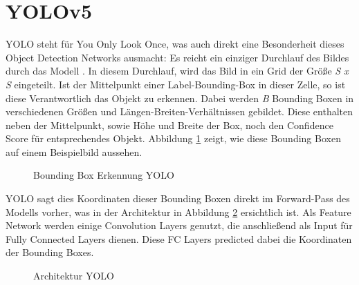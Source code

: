 \section{YOLOv5}
YOLO steht für You Only Look Once, was auch direkt eine Besonderheit dieses Object Detection Networks ausmacht: Es reicht ein einziger Durchlauf des Bildes durch das Modell \cite{yolo1}.
In diesem Durchlauf, wird das Bild in ein Grid der Größe \textit{S x S} eingeteilt. 
Ist der Mittelpunkt einer Label-Bounding-Box in dieser Zelle, so ist diese Verantwortlich das Objekt zu erkennen.
Dabei werden \textit{B} Bounding Boxen in verschiedenen Größen und Längen-Breiten-Verhältnissen gebildet. 
Diese enthalten neben der Mittelpunkt, sowie Höhe und Breite der Box, noch den Confidence Score für entsprechendes Objekt.
Abbildung \ref{fig:yolo1_bbox} zeigt, wie diese Bounding Boxen auf einem Beispielbild aussehen.\\
\begin{figure}[!htb]
    \centering
    \caption{Bounding Box Erkennung YOLO \cite{yolo1} }
    \label{fig:yolo1_bbox} 
\end{figure} 

YOLO sagt dies Koordinaten dieser Bounding Boxen direkt im Forward-Pass des Modells vorher, was in der Architektur in Abbildung \ref{fig:yolo1_arch} ersichtlich ist.
Als Feature Network werden einige Convolution Layers genutzt, die anschließend als Input für Fully Connected Layers dienen. 
Diese FC Layers predicted dabei die Koordinaten der Bounding Boxes.\\
\begin{figure}[!htb]
    \centering
    \caption{Architektur YOLO \cite{yolo1} }
    \label{fig:yolo1_arch}
\end{figure} 

